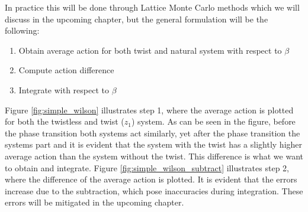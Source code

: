 \documentclass[english,twoside,openright]{UH_TCM_MSc}
\begin{document}
In practice this will be done through Lattice Monte Carlo methods which we will discuss in the upcoming chapter, but the general formulation will be the following:
\begin{enumerate}
    \item Obtain average action for both twist and natural system with respect to $\beta$
    \item Compute action difference
    \item Integrate with respect to $\beta$
\end{enumerate}
Figure \ref{fig:simple_wilson} illustrates step 1, where the average action is plotted for both the twistless and twist ($z_1$) system. As can be seen in the figure, before the phase transition both systems act similarly, yet after the phase transition the systems part and it is evident that the system with the twist has a slightly higher average action than the system without the twist. This difference is what we want to obtain and integrate. Figure \ref{fig:simple_wilson_subtract} illustrates step 2, where the difference of the average action is plotted. It is evident that the errors increase due to the subtraction, which pose inaccuracies during integration. These errors will be mitigated in the upcoming chapter.
\end{document}
